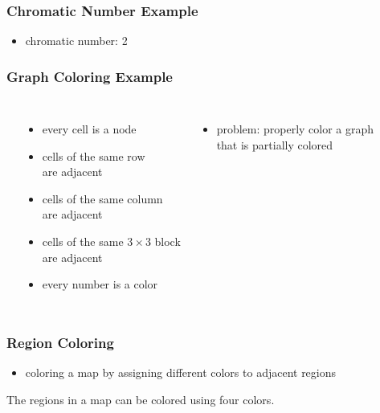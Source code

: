 \documentclass[dvipsnames]{beamer}
\begin{document}
\begin{frame}
  \frametitle{Chromatic Number Example}

  \begin{example}
    \begin{center}
    \end{center}

    \begin{itemize}
      \item chromatic number: 2
    \end{itemize}
  \end{example}
\end{frame}

\begin{frame}
  \frametitle{Graph Coloring Example}

  \begin{example}[Sudoku]
    \begin{columns}[t]
      \begin{center}
      \end{center}

      \begin{itemize}
        \item every cell is a node
        \item cells of the same row\\
          are adjacent
        \item cells of the same column\\
          are adjacent
        \item cells of the same $3 \times 3$ block\\
          are adjacent
        \item every number is a color
      \end{itemize}

      \pause
      \begin{itemize}
        \item problem: properly color a graph\\
          that is partially colored
      \end{itemize}
    \end{columns}
  \end{example}
\end{frame}

\begin{frame}
  \frametitle{Region Coloring}

  \begin{itemize}
    \item coloring a map by assigning different colors to adjacent regions
  \end{itemize}

  \medskip
  \begin{theorem}
    The regions in a map can be colored using four colors.
  \end{theorem}
\end{frame}
\end{document}
